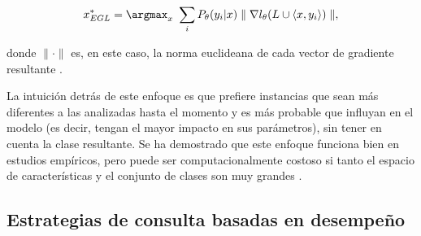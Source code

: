\begin{equation}
x_{EGL}^* =  \argmax_x \  \sum_i P_{\theta}(y_i|x) \parallel \nabla l_{\theta}(L \cup \langle x,y_i \rangle ) \parallel,
\end{equation}

donde $ \parallel \cdot \parallel$  es, en este caso, la norma euclideana de cada vector de gradiente resultante  \cite{settles2009survey}.





La intuición detrás de este enfoque es que prefiere instancias que sean más diferentes a las analizadas hasta el momento y es más probable que influyan en el modelo (es decir, tengan el mayor impacto en sus parámetros), sin tener en cuenta la clase resultante. Se ha demostrado que este enfoque funciona bien en estudios empíricos, pero puede ser computacionalmente costoso si tanto el espacio de características y el conjunto de clases son muy grandes \cite{settles2009survey}.  


\subsection{Estrategias de consulta basadas en desempeño}

